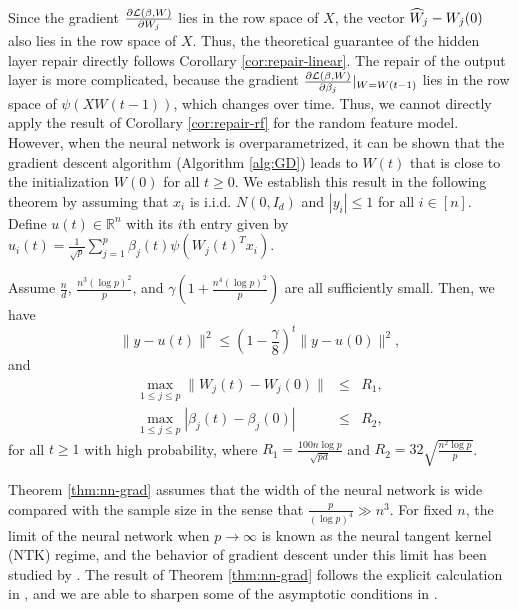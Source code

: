 Since the gradient $\frac{\partial {\mathcal L}(\beta,W)}{\partial W_j}$ lies in the row space of $X$, the vector $\widehat{W}_j-W_j(0)$ also lies in the row space of $X$. Thus, the theoretical guarantee of the hidden layer repair directly follows
Corollary \ref{cor:repair-linear}.
The repair of the output layer is more complicated, because the gradient $\frac{\partial {\mathcal L}(\beta,W)}{\partial \beta_j}|_{W=W(t-1)}$ lies in the row space of $\psi(XW(t-1))$, which changes over time. Thus, we cannot directly apply the result of Corollary \ref{cor:repair-rf} for the random feature model. However, when the neural network is overparametrized, it can be shown that the gradient descent algorithm (Algorithm \ref{alg:GD}) leads to $W(t)$ that is close to the initialization $W(0)$ for all $t\geq 0$. We establish this result in the following theorem by assuming that $x_i$ is i.i.d. $N(0,I_d)$ and $|y_i|\leq 1$ for all $i\in[n]$. Define $u(t)\in\mathbb{R}^n$ with its $i$th entry given by
$u_i(t)=\frac{1}{\sqrt{p}}\sum_{j=1}^p\beta_j(t)\psi(W_j(t)^Tx_i)$.
\vskip10pt
\begin{thm}\label{thm:nn-grad}
Assume $\frac{n}{d}$, $\frac{n^3(\log p)^2}{p}$, and $\gamma\left(1+\frac{n^4(\log p)^2}{p}\right)$ are all sufficiently small. Then, we have
\begin{equation}
\|y-u(t)\|^2 \leq \left(1-\frac{\gamma}{8}\right)^t\|y-u(0)\|^2, \label{eq:iter-function}
\end{equation}
and
\begin{eqnarray}
\label{eq:iter-parameter} \max_{1\leq j\leq p}\|W_j(t)-W_j(0)\| &\leq& R_1, \\
\label{eq:iter-parameter-beta} \max_{1\leq j\leq p}|\beta_j(t)-\beta_j(0)| &\leq& R_2,
\end{eqnarray}
for all $t\geq 1$ with high probability, where $R_1=\frac{100n\log p}{\sqrt{pd}}$ and $R_2=32\sqrt{\frac{n^2\log p}{p}}$.
\end{thm}

Theorem \ref{thm:nn-grad} assumes that the width of the neural network is wide compared with the sample size in the sense that $\frac{p}{(\log p)^4}\gg n^3$. For fixed $n$, the limit of the neural network when $p\rightarrow\infty$ is known as the neural tangent kernel (NTK) regime, and the behavior of gradient descent under this limit has been studied by \cite{jacot2018neural}. The result of Theorem \ref{thm:nn-grad} follows the explicit calculation in \cite{du2018gradient}, and we are able to sharpen some of the asymptotic conditions in \cite{du2018gradient}.

